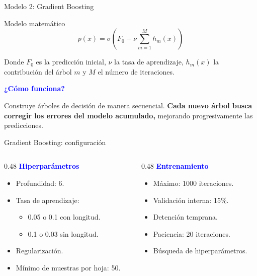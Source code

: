 \documentclass[12pt, aspectratio=43]{beamer}
\begin{document}
\begin{frame}{Modelo 2: Gradient Boosting}
\begin{block}{Modelo matemático}
\[
\boxed{
p(x)=\sigma\left(
F_0+\nu\sum_{m=1}^{M}h_m(x)
\right)
}
\]

\small
Donde $F_0$ es la predicción inicial, $\nu$ la tasa de aprendizaje,
$h_m(x)$ la contribución del árbol $m$ y $M$ el número de iteraciones.
\end{block}

\textbf{\textcolor{blue}{¿Cómo funciona?}}

\justifying
Construye árboles de decisión de manera secuencial. \textbf{Cada nuevo árbol busca corregir los errores del modelo acumulado,} mejorando progresivamente las predicciones.

\vspace{0.3cm}


\end{frame}

\begin{frame}{Gradient Boosting: configuración}

\begin{columns}[T,onlytextwidth]

\begin{column}{0.48\textwidth}
\textbf{\textcolor{blue}{Hiperparámetros}}

\begin{itemize}
    \item Profundidad: 6.
    \item Tasa de aprendizaje:
    \begin{itemize}
        \item 0.05 o 0.1 con longitud.
        \item 0.1 o 0.03 sin longitud.
    \end{itemize}
    \item Regularización.
    \item Mínimo de muestras por hoja: 50.
\end{itemize}
\end{column}

\begin{column}{0.48\textwidth}
\textbf{\textcolor{blue}{Entrenamiento}}

\begin{itemize}
    \item Máximo: 1000 iteraciones.
    \item Validación interna: 15\%.
    \item Detención temprana.
    \item Paciencia: 20 iteraciones.
    \item Búsqueda de hiperparámetros.
\end{itemize}
\end{column}
\end{columns}
\end{frame}
\end{document}
